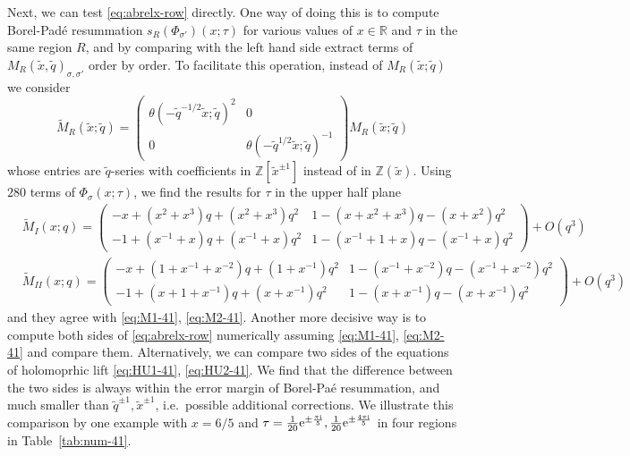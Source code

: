 \documentclass[12pt,reqno]{amsart}
\theoremstyle{definition}
\def\IZ{\mathbb{Z}}
\def\s{\sigma}
\def\tq{\tilde{q}}
\def\tx{\tilde{x}}
\def\ri{\mathrm{i}}
\def\wt{\widetilde}
\def\tx{\tilde{x}}
\def\re{{\rm e}}
\def\ri{{\rm i}}
\def\IR{\mathbb{R}}
\def\IZ{\mathbb{Z}}
\begin{document}
Next, we can test \eqref{eq:abrelx-row} directly.  One way of doing
this is to compute Borel-Pad\'e resummation $s_R(\Phi_{\s'})(x;\tau)$
for various values of $x\in \IR$ and $\tau$ in the same region $R$,
and by comparing with the left hand side extract terms of
$M_R(\tx,\tq)_{\s,\s'}$ order by order.  To facilitate this operation,
instead of $M_R(\tx;\tq)$ we consider
\begin{equation}
  \wt{M}_R(\tx;\tq) =
  \begin{pmatrix}
    \theta(-\tq^{-1/2}\tx;\tq)^2&0\\
    0&\theta(-\tq^{1/2}\tx;\tq)^{-1}
  \end{pmatrix}M_R(\tx;\tq)
\end{equation}
whose entries are $\tq$-series with coefficients in $\IZ[\tx^{\pm 1}]$
instead of in $\IZ(\tx)$.
Using $280$ terms of $\Phi_{\s}(x;\tau)$, we find the results for
$\tau$ in the upper half plane
\begin{subequations}
\begin{align}
  &\wt{M}_I(x;q) =
    \begin{pmatrix}
      -x + (x^2+x^3)q + (x^2+x^3)q^2 & 1-(x+x^2+x^3)q-(x+x^2)q^2\\
      -1+(x^{-1}+x)q+(x^{-1}+x)q^2 & 1-(x^{-1}+1+x)q-(x^{-1}+x)q^2
    \end{pmatrix}+O(q^3)\\
  &\wt{M}_{II}(x;q) =
    \begin{pmatrix}
      -x+(1+x^{-1}+x^{-2})q+(1+x^{-1})q^2 &
      1-(x^{-1}+x^{-2})q-(x^{-1}+x^{-2})q^2\\
      -1+(x+1+x^{-1})q+(x+x^{-1})q^2&
      1-(x+x^{-1})q-(x+x^{-1})q^2
    \end{pmatrix}+O(q^3)
\end{align}
\end{subequations}
and they agree with \eqref{eq:M1-41}, \eqref{eq:M2-41}.  Another more
decisive way is to compute both sides of \eqref{eq:abrelx-row}
numerically assuming \eqref{eq:M1-41}, \eqref{eq:M2-41} and compare
them.  Alternatively, we can compare two sides of the equations of
holomoprhic lift \eqref{eq:HU1-41}, \eqref{eq:HU2-41}.  We find that
the difference between the two sides is always within the error margin
of Borel-Pa\'e resummation, and much smaller than
$\tq^{\pm 1},\tx^{\pm 1}$, i.e.~possible additional corrections. We
illustrate this comparison by one example with $x=6/5$ and
$\tau = \frac{1}{20}\re^{\pm\frac{\pi\ri}{5}},
\frac{1}{20}\re^{\pm\frac{4\pi\ri}{5}}$ in four regions in
Table~\ref{tab:num-41}.
\end{document}
